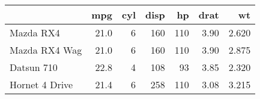 
\begin{tabular}{l|r|r|r|r|r|r}
\hline
  & mpg & cyl & disp & hp & drat & wt\\
\hline
Mazda RX4 & 21.0 & 6 & 160 & 110 & 3.90 & 2.620\\
\hline
Mazda RX4 Wag & 21.0 & 6 & 160 & 110 & 3.90 & 2.875\\
\hline
Datsun 710 & 22.8 & 4 & 108 & 93 & 3.85 & 2.320\\
\hline
Hornet 4 Drive & 21.4 & 6 & 258 & 110 & 3.08 & 3.215\\
\hline
\end{tabular}
